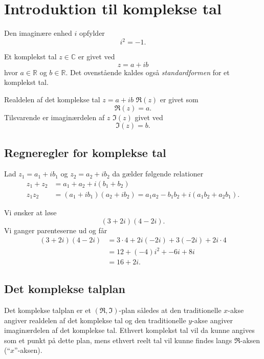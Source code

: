\section{Introduktion til komplekse tal}
\begin{definition} 
  Den imaginære enhed $i$ opfylder
  \[ 
  i^2 = -1
  .\]
\end{definition}

\begin{definition} 
  Et komplekst tal $z \in \mathbb{C}$ er givet ved
  \[ 
  z = a + ib
  \]
  hvor $a \in \mathbb{R}$ og $b \in \mathbb{R}$. Det ovenstående kaldes også \textit{standardformen} for et komplekst tal.
\end{definition}

\begin{definition} 
  Realdelen af det komplekse tal $z = a + ib$ $\Re(z)$ er givet som
  \[ 
    \Re( z ) = a
  .\]
  Tilsvarende er imaginærdelen af $z$ $\Im(z)$ givet ved
  \[ 
    \Im( z ) = b
  .\]
\end{definition}

\subsection{Regneregler for komplekse tal}
Lad $z_1 = a_1 + ib_1$ og $z_2 = a_2 + ib_2$ da gælder følgende relationer
\begin{align*}
  z_1 + z_2 &= a_1 + a_2 + i(b_1 + b_2) \\
  z_1z_2 &= (a_1 + ib_1)(a_2 + ib_2) = a_1a_2 - b_1b_2 + i(a_1b_2 + a_2b_1)
.\end{align*}

\begin{eks} 
  Vi ønsker at løse
  \[ 
    (3+2i)(4-2i)
  .\]
  Vi ganger parenteserne ud og får
  \begin{align*}
    (3+2i)(4-2i) &= 3\cdot 4 + 2i(-2i) + 3(-2i) + 2i \cdot 4 \\
    &= 12 + (-4)i^2 + -6i + 8i\\
    &= 16 + 2i
  .\end{align*}
\end{eks}

\subsection{Det komplekse talplan}
Det komplekse talplan er et $(\Re, \Im)$-plan således at den traditionelle $x$-akse angiver realdelen af det komplekse tal og den traditionelle $y$-akse angiver imaginærdelen af det komplekse tal. Ethvert komplekst tal vil da kunne angives som et punkt på dette plan, mens ethvert reelt tal vil kunne findes langs $\Re$-aksen (``$x$''-aksen).

